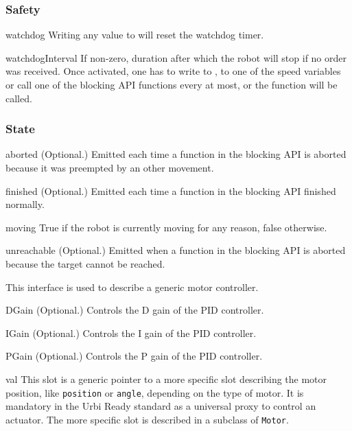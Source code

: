 \subsubsection{Safety}

\begin{urbiscriptapi}
\item[watchdog] Writing any value to  will reset the
  watchdog timer.


\item[watchdogInterval] If non-zero, duration after which the robot will
  stop if no order was received. Once activated, one has to write to
  , to one of the speed variables or call one of the
  blocking API functions every  at most, or the
   function will be called.
\end{urbiscriptapi}

\subsubsection{State}

\begin{urbiscriptapi}
\item[aborted]{} (Optional.) Emitted each time a function in the blocking
  API is aborted because it was preempted by an other movement.


\item[finished]{} (Optional.) Emitted each time a function in the blocking
  API finished normally.


\item[moving] True if the robot is currently moving for any reason, false
  otherwise.


\item[unreachable]{} (Optional.) Emitted when a function in the blocking API
  is aborted because the target cannot be reached.
\end{urbiscriptapi}




This interface is used to describe a generic motor controller.

\begin{urbiscriptapi}
\item[DGain]{} (Optional.) Controls the D gain of the PID controller.


\item[IGain]{} (Optional.) Controls the I gain of the PID controller.


\item[PGain]{} (Optional.) Controls the P gain of the PID controller.


\item[val] This slot is a generic pointer to a more specific slot describing
  the motor position, like \lstinline{position} or \lstinline{angle},
  depending on the type of motor. It is mandatory in the Urbi Ready standard
  as a universal proxy to control an actuator. The more specific slot is
  described in a subclass of \lstinline{Motor}.
\end{urbiscriptapi}


